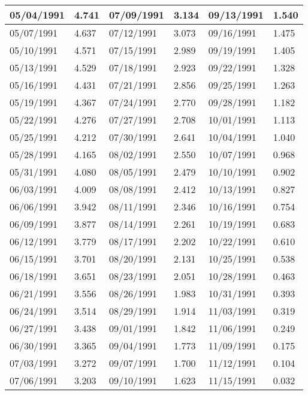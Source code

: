 \begin{tabular}{|l|l|l|l|l|l|}
\hline
05/04/1991 & 4.741  & 07/09/1991 & 3.134  & 09/13/1991 & 1.540  \\
\hline
05/07/1991 & 4.637  & 07/12/1991 & 3.073  & 09/16/1991 & 1.475  \\
\hline
05/10/1991 & 4.571  & 07/15/1991 & 2.989  & 09/19/1991 & 1.405  \\
\hline
05/13/1991 & 4.529  & 07/18/1991 & 2.923  & 09/22/1991 & 1.328  \\
\hline
05/16/1991 & 4.431  & 07/21/1991 & 2.856  & 09/25/1991 & 1.263  \\
\hline
05/19/1991 & 4.367  & 07/24/1991 & 2.770  & 09/28/1991 & 1.182  \\
\hline
05/22/1991 & 4.276  & 07/27/1991 & 2.708  & 10/01/1991 & 1.113  \\
\hline
05/25/1991 & 4.212  & 07/30/1991 & 2.641  & 10/04/1991 & 1.040  \\
\hline
05/28/1991 & 4.165  & 08/02/1991 & 2.550  & 10/07/1991 & 0.968  \\
\hline
05/31/1991 & 4.080  & 08/05/1991 & 2.479  & 10/10/1991 & 0.902  \\
\hline
06/03/1991 & 4.009  & 08/08/1991 & 2.412  & 10/13/1991 & 0.827  \\
\hline
06/06/1991 & 3.942  & 08/11/1991 & 2.346  & 10/16/1991 & 0.754  \\
\hline
06/09/1991 & 3.877  & 08/14/1991 & 2.261  & 10/19/1991 & 0.683  \\
\hline
06/12/1991 & 3.779  & 08/17/1991 & 2.202  & 10/22/1991 & 0.610  \\
\hline
06/15/1991 & 3.701  & 08/20/1991 & 2.131  & 10/25/1991 & 0.538  \\
\hline
06/18/1991 & 3.651  & 08/23/1991 & 2.051  & 10/28/1991 & 0.463  \\
\hline
06/21/1991 & 3.556  & 08/26/1991 & 1.983  & 10/31/1991 & 0.393  \\
\hline
06/24/1991 & 3.514  & 08/29/1991 & 1.914  & 11/03/1991 & 0.319  \\
\hline
06/27/1991 & 3.438  & 09/01/1991 & 1.842  & 11/06/1991 & 0.249  \\
\hline
06/30/1991 & 3.365  & 09/04/1991 & 1.773  & 11/09/1991 & 0.175  \\
\hline
07/03/1991 & 3.272  & 09/07/1991 & 1.700  & 11/12/1991 & 0.104  \\
\hline
07/06/1991 & 3.203  & 09/10/1991 & 1.623  & 11/15/1991 & 0.032  \\
\hline
\end{tabular}
